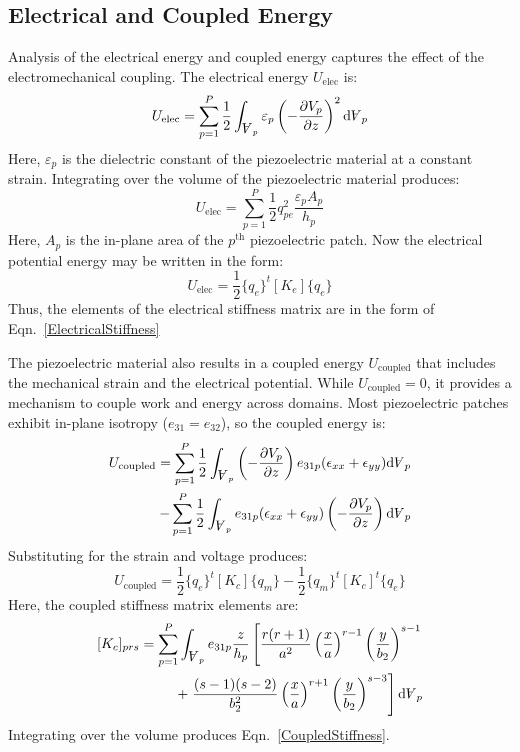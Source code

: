 \documentclass[thesis]{fputhesis}
\newcommand{\Vol}{\rotatebox[origin=c]{180}{\ensuremath{A}}}
\begin{document}
\begin{body}
\begin{appendices}
\subsection{Electrical and Coupled Energy}
Analysis of the electrical energy and coupled energy captures the effect of the electromechanical coupling. The electrical energy $U_{\text{elec}}$ is:
\begin{equation}
U_{\text{elec}}=\sum_{p=1}^P \frac{1}{2}\int_{\Vol_p} \varepsilon_p \left(-\frac{\partial V_p}{\partial z} \right)^2 \text{d}\Vol_p
\end{equation}
Here, $\varepsilon_p$ is the dielectric constant of the piezoelectric material at a constant strain. Integrating over the volume of the piezoelectric material produces:
\begin{equation}
U_{\text{elec}}=\sum_{p=1}^P \frac{1}{2}q_{pe}^2 \frac{\varepsilon_p A_p}{h_p}
\end{equation}
Here, $A_p$ is the in-plane area of the $p^{\text{th}}$ piezoelectric patch. Now the electrical potential energy may be written in the form:
\begin{equation}
U_{\text{elec}}=\frac{1}{2}\{q_e\}^t [K_e] \{q_e\}
\end{equation}
Thus, the elements of the electrical stiffness matrix are in the form of Eqn.~\eqref{ElectricalStiffness}

The piezoelectric material also results in a coupled energy $U_{\text{coupled}}$ that includes the mechanical strain and the electrical potential. While $U_{\text{coupled}}=0$, it provides a mechanism to couple work and energy across domains. Most piezoelectric patches exhibit in-plane isotropy ($e_{31}=e_{32}$), so the coupled energy is:
\begin{equation}
\begin{split}
U_{\text{coupled}}=\sum_{p=1}^P \frac{1}{2}\int_{\Vol_p}\left(-\frac{\partial V_p}{\partial z} \right)e_{31p} (\epsilon_{xx}+\epsilon_{yy})\text{d}\Vol_p \\
-\sum_{p=1}^P\frac{1}{2}\int_{\Vol_p}e_{31p} (\epsilon_{xx}+\epsilon_{yy})\left(-\frac{\partial V_p}{\partial z} \right)\text{d}\Vol_p
\end{split}
\end{equation}
Substituting for the strain and voltage produces:
\begin{equation}
U_{\text{coupled}}=\frac{1}{2}\{q_e\}^t[K_c]\{q_m\}-\frac{1}{2}\{q_m\}^t[K_c]^t \{q_e\}
\end{equation}
Here, the coupled stiffness matrix elements are:
\begin{equation}
\begin{split}
[K_c]_{prs}=\sum_{p=1}^P \int_{\Vol_p} e_{31p} \frac{z}{h_p}\left[\frac{r(r+1)}{a^2}\left(\frac{x}{a}\right)^{r-1}\left(\frac{y}{b_2}\right)^{s-1}\right. \\
+\left. \frac{(s-1)(s-2)}{b_2^2}\left(\frac{x}{a}\right)^{r+1}\left(\frac{y}{b_2}\right)^{s-3}\right] \text{d}\Vol_p
\end{split}
\end{equation}
Integrating over the volume produces Eqn.~\eqref{CoupledStiffness}.




\end{appendices}
\end{body}
\end{document}
